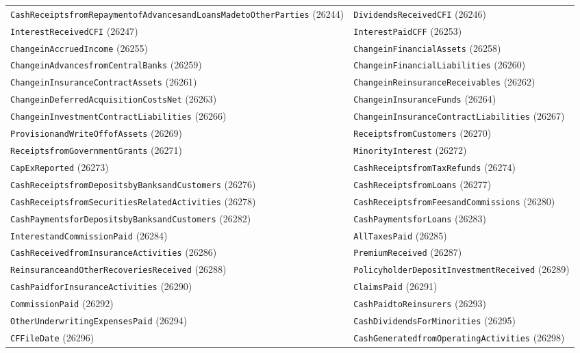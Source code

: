 \documentclass[11pt,a4paper]{report}
\begin{document}
\begin{subappendices}
{\begin{longtable}{@{}p{}p{}@{}}
\texttt{CashReceiptsfromRepaymentofAdvancesandLoansMadetoOtherParties} (26244) & \texttt{DividendsReceivedCFI} (26246) \\
\texttt{InterestReceivedCFI} (26247) & \texttt{InterestPaidCFF} (26253) \\
\texttt{ChangeinAccruedIncome} (26255) & \texttt{ChangeinFinancialAssets} (26258) \\
\texttt{ChangeinAdvancesfromCentralBanks} (26259) & \texttt{ChangeinFinancialLiabilities} (26260) \\
\texttt{ChangeinInsuranceContractAssets} (26261) & \texttt{ChangeinReinsuranceReceivables} (26262) \\
\texttt{ChangeinDeferredAcquisitionCostsNet} (26263) & \texttt{ChangeinInsuranceFunds} (26264) \\
\texttt{ChangeinInvestmentContractLiabilities} (26266) & \texttt{ChangeinInsuranceContractLiabilities} (26267) \\
\texttt{ProvisionandWriteOffofAssets} (26269) & \texttt{ReceiptsfromCustomers} (26270) \\
\texttt{ReceiptsfromGovernmentGrants} (26271) & \texttt{MinorityInterest} (26272) \\
\texttt{CapExReported} (26273) & \texttt{CashReceiptsfromTaxRefunds} (26274) \\
\texttt{CashReceiptsfromDepositsbyBanksandCustomers} (26276) & \texttt{CashReceiptsfromLoans} (26277) \\
\texttt{CashReceiptsfromSecuritiesRelatedActivities} (26278) & \texttt{CashReceiptsfromFeesandCommissions} (26280) \\
\texttt{CashPaymentsforDepositsbyBanksandCustomers} (26282) & \texttt{CashPaymentsforLoans} (26283) \\
\texttt{InterestandCommissionPaid} (26284) & \texttt{AllTaxesPaid} (26285) \\
\texttt{CashReceivedfromInsuranceActivities} (26286) & \texttt{PremiumReceived} (26287) \\
\texttt{ReinsuranceandOtherRecoveriesReceived} (26288) & \texttt{PolicyholderDepositInvestmentReceived} (26289) \\
\texttt{CashPaidforInsuranceActivities} (26290) & \texttt{ClaimsPaid} (26291) \\
\texttt{CommissionPaid} (26292) & \texttt{CashPaidtoReinsurers} (26293) \\
\texttt{OtherUnderwritingExpensesPaid} (26294) & \texttt{CashDividendsForMinorities} (26295) \\
\texttt{CFFileDate} (26296) & \texttt{CashGeneratedfromOperatingActivities} (26298) \\

\end{longtable}}
\end{subappendices}
\end{document}
